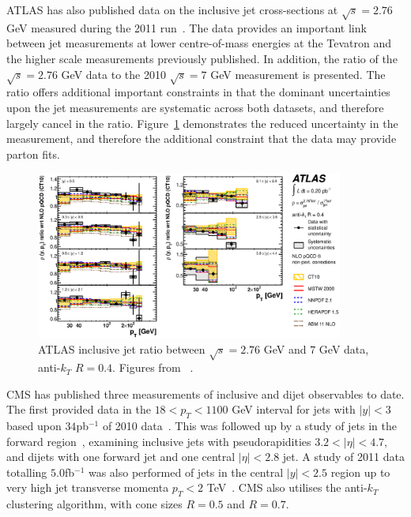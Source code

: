 ATLAS has also published data on the inclusive jet cross-sections at $\sqrt{s} = 2.76$ GeV measured during the 2011 run~\cite{Aad:2013lpa}. The data provides an important link between jet measurements at lower centre-of-mass energies at the Tevatron and the higher scale measurements previously published. In addition, the ratio of the $\sqrt{s} = 2.76$ GeV data to the 2010 $\sqrt{s}=7$ GeV measurement is presented. The ratio offers additional important constraints in that the dominant uncertainties upon the jet measurements are systematic across both datasets, and therefore largely cancel in the ratio. Figure~\ref{fig:ATLASJETSRAT} demonstrates the reduced uncertainty in the measurement, and therefore the additional constraint that the data may provide parton fits.

\begin{figure}[ht]
\centering
\includegraphics[width=0.90\textwidth]{5-LHCdata/figs/FinalRatioBandPTR04.eps}
\caption[ATLAS inclusive jet ratio between $\sqrt{s} = 2.76$ GeV and $7$ GeV data] {ATLAS inclusive jet ratio between $\sqrt{s} = 2.76$ GeV and $7$ GeV data, anti-$k_T$ $R=0.4$. Figures from ~\cite{Aad:2013lpa}.}
\label{fig:ATLASJETSRAT}
\end{figure}


CMS has published three measurements of inclusive and dijet observables to date. The first provided data in the $18 < p_T < 1100$ GeV interval for jets with $|y|<3$ based upon $34$pb$^{-1}$ of 2010 data~\cite{CMS:2011ab}. This was followed up
by a study of jets in the forward region~\cite{Chatrchyan:2012gwa}, examining inclusive jets with pseudorapidities $3.2<|\eta|<4.7$, and dijets with one forward jet and one central $|\eta|<2.8$ jet. A study of 2011 data totalling $5.0$fb$^{-1}$ was also
performed of jets in the central $|y|<2.5$ region up to very high jet transverse momenta $p_T < 2$ TeV~\cite{Chatrchyan:2012bja}. CMS also utilises the anti-$k_T$ clustering algorithm, with cone sizes $R=0.5$ and $R=0.7$.


